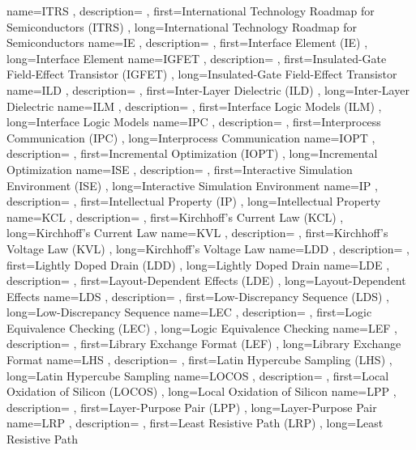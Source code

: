 { name={ITRS}
, description={}
, first={International Technology Roadmap for Semiconductors (ITRS)}
, long={International Technology Roadmap for Semiconductors}
}
{ name={IE}
, description={}
, first={Interface Element (IE)}
, long={Interface Element}
}
{ name={IGFET}
, description={}
, first={Insulated-Gate Field-Effect Transistor (IGFET)}
, long={Insulated-Gate Field-Effect Transistor}
}
{ name={ILD}
, description={}
, first={Inter-Layer Dielectric (ILD)}
, long={Inter-Layer Dielectric}
}
{ name={ILM}
, description={}
, first={Interface Logic Models (ILM)}
, long={Interface Logic Models}
}
{ name={IPC}
, description={}
, first={Interprocess Communication (IPC)}
, long={Interprocess Communication}
}
{ name={IOPT}
, description={}
, first={Incremental Optimization (IOPT)}
, long={Incremental Optimization}
}
{ name={ISE}
, description={}
, first={Interactive Simulation Environment (ISE)}
, long={Interactive Simulation Environment}
}
{ name={IP}
, description={}
, first={Intellectual Property (IP)}
, long={Intellectual Property}
}
{ name={KCL}
, description={}
, first={Kirchhoff’s Current Law (KCL)}
, long={Kirchhoff’s Current Law}
}
{ name={KVL}
, description={}
, first={Kirchhoff’s Voltage Law (KVL)}
, long={Kirchhoff’s Voltage Law}
}
{ name={LDD}
, description={}
, first={Lightly Doped Drain (LDD)}
, long={Lightly Doped Drain}
}
{ name={LDE}
, description={}
, first={Layout-Dependent Effects (LDE)}
, long={Layout-Dependent Effects}
}
{ name={LDS}
, description={}
, first={Low-Discrepancy Sequence (LDS)}
, long={Low-Discrepancy Sequence}
}
{ name={LEC}
, description={}
, first={Logic Equivalence Checking (LEC)}
, long={Logic Equivalence Checking}
}
{ name={LEF}
, description={}
, first={Library Exchange Format (LEF)}
, long={Library Exchange Format}
}
{ name={LHS}
, description={}
, first={Latin Hypercube Sampling (LHS)}
, long={Latin Hypercube Sampling}
}
{ name={LOCOS}
, description={}
, first={Local Oxidation of Silicon (LOCOS)}
, long={Local Oxidation of Silicon}
}
{ name={LPP}
, description={}
, first={Layer-Purpose Pair (LPP)}
, long={Layer-Purpose Pair}
}
{ name={LRP}
, description={}
, first={Least Resistive Path (LRP)}
, long={Least Resistive Path}
}
